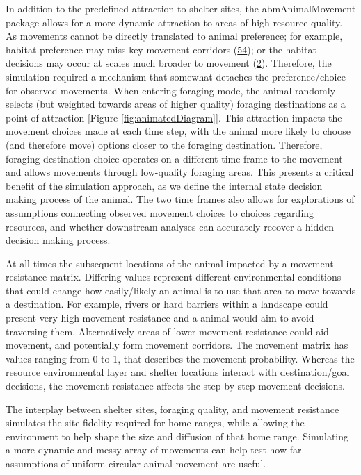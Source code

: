 \documentclass[10pt,a4paper]{article}
\begin{document}
In addition to the predefined attraction to shelter sites, the abmAnimalMovement package allows for a more dynamic attraction to areas of high resource quality.
As movements cannot be directly translated to animal preference; for example, habitat preference may miss key movement corridors (\protect\hyperlink{ref-Scharf2018}{54}); or the habitat decisions may occur at scales much broader to movement (\protect\hyperlink{ref-Bastille-Rousseau2017}{2}).
Therefore, the simulation required a mechanism that somewhat detaches the preference/choice for observed movements.
When entering foraging mode, the animal randomly selects (but weighted towards areas of higher quality) foraging destinations as a point of attraction {[}Figure \ref{fig:animatedDiagram}{]}.
This attraction impacts the movement choices made at each time step, with the animal more likely to choose (and therefore move) options closer to the foraging destination.
Therefore, foraging destination choice operates on a different time frame to the movement and allows movements through low-quality foraging areas.
This presents a critical benefit of the simulation approach, as we define the internal state decision making process of the animal.
The two time frames also allows for explorations of assumptions connecting observed movement choices to choices regarding resources, and whether downstream analyses can accurately recover a hidden decision making process.

At all times the subsequent locations of the animal impacted by a movement resistance matrix.
Differing values represent different environmental conditions that could change how easily/likely an animal is to use that area to move towards a destination.
For example, rivers or hard barriers within a landscape could present very high movement resistance and a animal would aim to avoid traversing them.
Alternatively areas of lower movement resistance could aid movement, and potentially form movement corridors.
The movement matrix has values ranging from 0 to 1, that describes the movement probability.
Whereas the resource environmental layer and shelter locations interact with destination/goal decisions, the movement resistance affects the step-by-step movement decisions.

The interplay between shelter sites, foraging quality, and movement resistance simulates the site fidelity required for home ranges, while allowing the environment to help shape the size and diffusion of that home range.
Simulating a more dynamic and messy array of movements can help test how far assumptions of uniform circular animal movement are useful.
\end{document}
